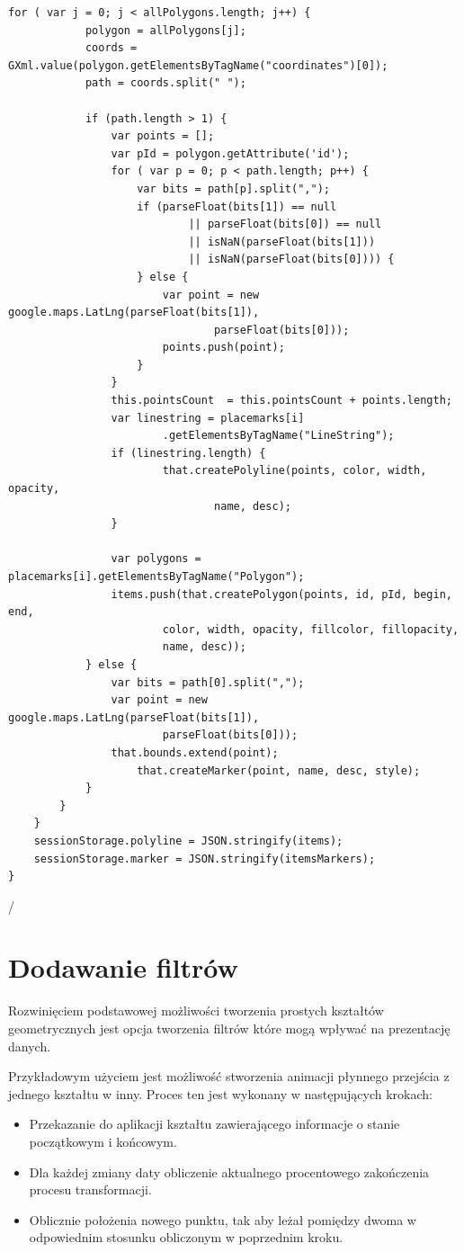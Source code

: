 \begin{lstlisting}[label={lst:minconf},caption={Parser plików.}]
		for ( var j = 0; j < allPolygons.length; j++) {
			polygon = allPolygons[j];
			coords = GXml.value(polygon.getElementsByTagName("coordinates")[0]);
			path = coords.split(" ");

			if (path.length > 1) {
				var points = [];
				var pId = polygon.getAttribute('id');
				for ( var p = 0; p < path.length; p++) {
					var bits = path[p].split(",");
					if (parseFloat(bits[1]) == null
							|| parseFloat(bits[0]) == null
							|| isNaN(parseFloat(bits[1]))
							|| isNaN(parseFloat(bits[0]))) {
					} else {
						var point = new google.maps.LatLng(parseFloat(bits[1]),
								parseFloat(bits[0]));
						points.push(point);
					}
				}
				this.pointsCount  = this.pointsCount + points.length;
				var linestring = placemarks[i]
						.getElementsByTagName("LineString");
				if (linestring.length) {
						that.createPolyline(points, color, width, opacity,
								name, desc);
				}

				var polygons = placemarks[i].getElementsByTagName("Polygon");
				items.push(that.createPolygon(points, id, pId, begin, end,
						color, width, opacity, fillcolor, fillopacity,
						name, desc));
			} else {
				var bits = path[0].split(",");
				var point = new google.maps.LatLng(parseFloat(bits[1]),
						parseFloat(bits[0]));
				that.bounds.extend(point);
					that.createMarker(point, name, desc, style);
			}
		}
	}
	sessionStorage.polyline = JSON.stringify(items);
	sessionStorage.marker = JSON.stringify(itemsMarkers);
}

\end{lstlisting}/

\section{Dodawanie filtrów}
\label{sec:filters}

Rozwinięciem podstawowej możliwości tworzenia prostych kształtów geometrycznych jest opcja tworzenia filtrów które mogą wpływać na prezentację danych.

Przykładowym użyciem jest możliwość stworzenia animacji płynnego przejścia z jednego kształtu w inny. Proces ten jest wykonany w następujących krokach:

\begin{itemize}
\item
Przekazanie do aplikacji kształtu zawierającego informacje o stanie początkowym i końcowym.
\item
Dla każdej zmiany daty obliczenie aktualnego procentowego zakończenia procesu transformacji.
\item
Oblicznie położenia nowego punktu, tak aby leżał pomiędzy dwoma w odpowiednim stosunku obliczonym w poprzednim kroku.
\end{itemize}

